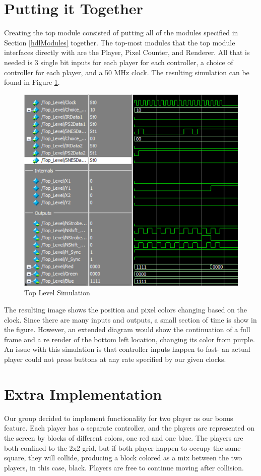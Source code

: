 \documentclass[]{article}
\begin{document}
\section{Putting it Together}
Creating the top module consisted of putting all of the modules specified in Section \ref{hdlModules} together. The top-most modules that the top module interfaces directly with are the Player, Pixel Counter, and Renderer. All that is needed is 3 single bit inputs for each player for each controller, a choice of controller for each player, and a 50 MHz clock. The resulting simulation can be found in Figure \ref{fig:topSim}.
\begin{figure}[H]\centering
    \includegraphics[width=\linewidth]{figures/Top_Sim.png}
    \caption{Top Level Simulation}
    \label{fig:topSim}
\end{figure}
The resulting image shows the position and pixel colors changing based on the clock. Since there are many inputs and outputs, a small section of time is show in the figure. However, an extended diagram would show the continuation of a full frame and a re render of the bottom left location, changing its color from purple.
An issue with this simulation is that controller inputs happen to fast- an actual player could not press buttons at any rate specified by our given clocks.

\section{Extra Implementation}
Our group decided to implement functionality for two player as our bonus feature. Each player has a separate controller, and the players are represented on the screen by blocks of different colors, one red and one blue. The players are both confined to the 2x2 grid, but if both player happen to occupy the same square, they will collide, producing a block colored as a mix between the two players, in this case, black. Players are free to continue moving after collision.
\end{document}
